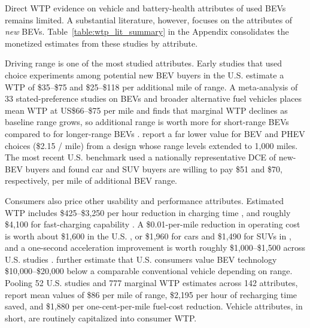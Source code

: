\documentclass[a4paper,fleqn]{cas-sc}   %
\begin{document}
Direct WTP evidence on vehicle and battery-health attributes of used BEVs remains limited. A substantial literature, however, focuses on the attributes of \emph{new} BEVs. Table~\ref{table:wtp_lit_summary} in the Appendix consolidates the monetized estimates from these studies by attribute.

Driving range is one of the most studied attributes. Early studies that used choice experiments among potential new BEV buyers in the U.S. estimate a WTP of \$35--\$75 \parencite{hidrueWillingnessPayElectric2011} and \$25--\$118 \parencite{helvestonWillSubsidiesDrive2015} per additional mile of range. A meta-analysis of 33 stated-preference studies on BEVs and broader alternative fuel vehicles places mean WTP at US\$66--\$75 per mile and finds that marginal WTP declines as baseline range grows, so additional range is worth more for short-range BEVs compared to for longer-range BEVs \parencite{dimitropoulosConsumerValuationChanges2013}. \textcite{tanakaConsumersWillingnessPay2014} report a far lower value for BEV and PHEV choices (\$2.15 / mile) from a design whose range levels extended to 1,000 miles. The most recent U.S. benchmark \parencite{forsytheTechnologyAdvancementDriving2023} used a nationally representative DCE of new-BEV buyers and found car and SUV buyers are willing to pay \$51 and \$70, respectively, per mile of additional BEV range. 

Consumers also price other usability and performance attributes. Estimated WTP includes \$425--\$3,250 per hour reduction in charging time \parencite{hidrueWillingnessPayElectric2011}, and roughly \$4,100 for fast-charging capability \parencite{forsytheTechnologyAdvancementDriving2023}. A \$0.01-per-mile reduction in operating cost is worth about \$1,600 in the U.S. \parencite{helvestonWillSubsidiesDrive2015}, or \$1,960 for cars and \$1,490 for SUVs in \textcite{forsytheTechnologyAdvancementDriving2023}, and a one-second acceleration improvement is worth roughly \$1,000--\$1,500 across U.S. studies \parencite{helvestonWillSubsidiesDrive2015, forsytheTechnologyAdvancementDriving2023, greeneConsumerWillingnessPay2018}. \textcite{helvestonWillSubsidiesDrive2015} further estimate that U.S. consumers value BEV technology \$10,000--\$20,000 below a comparable conventional vehicle depending on range. Pooling 52 U.S. studies and 777 marginal WTP estimates across 142 attributes, \textcite{greeneConsumerWillingnessPay2018} report mean values of \$86 per mile of range, \$2,195 per hour of recharging time saved, and \$1,880 per one-cent-per-mile fuel-cost reduction. Vehicle attributes, in short, are routinely capitalized into consumer WTP. 
\end{document}
